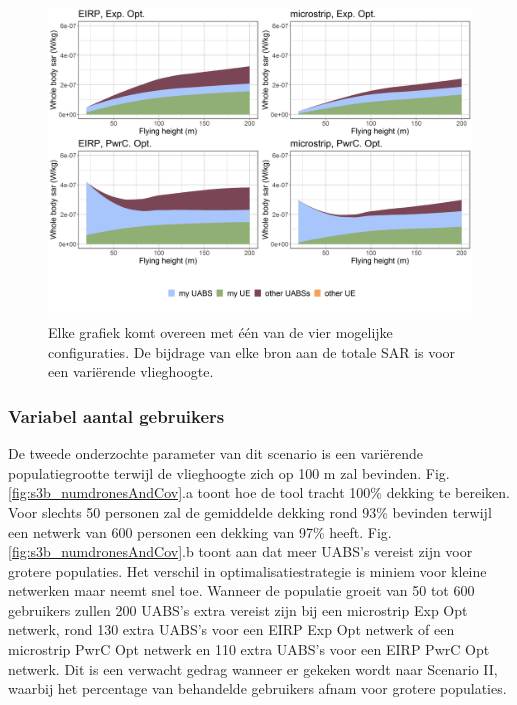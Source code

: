 \documentclass[twocolumn]{phdsymp_dutch}
\begin{document}
\begin{figure}[h!]
  \includegraphics[width=\linewidth]{../results/s3/fhFourSources.png}
  \caption{Elke grafiek komt overeen met \'e\'en van de vier mogelijke configuraties.
   De bijdrage van elke bron aan de totale \acs{SAR} is voor een variërende vlieghoogte.}
  \label{fig:s3a_fourSourcesMatrix}
\end{figure}

\subsubsection{Variabel aantal gebruikers}
De tweede onderzochte parameter van dit scenario is een vari\"erende populatiegrootte
terwijl de vlieghoogte zich op 100 m zal bevinden.
Fig.  \ref{fig:s3b_numdronesAndCov}.a toont hoe de tool tracht 100\% dekking te bereiken.
Voor slechts 50 personen zal de gemiddelde dekking
 rond 93\% bevinden terwijl een netwerk van 600 personen een dekking van 97\% heeft.
Fig. \ref{fig:s3b_numdronesAndCov}.b toont aan dat meer \gls{UABS}'s  vereist zijn voor grotere populaties.
Het verschil in optimalisatiestrategie is miniem voor kleine netwerken maar neemt snel toe. 
Wanneer de populatie groeit van 50 tot 600 gebruikers zullen 200 \gls{UABS}'s extra vereist zijn bij een
 microstrip \gls{Exp Opt} netwerk,
 rond 130 extra \gls{UABS}'s voor een \gls{EIRP} \gls{Exp Opt} netwerk of een microstrip \gls{PwrC Opt} netwerk
 en 110 extra \gls{UABS}'s voor een \gls{EIRP} \gls{PwrC Opt} netwerk.
Dit is een verwacht gedrag wanneer er gekeken wordt naar Scenario II,
waarbij het percentage van behandelde gebruikers afnam voor grotere populaties.
\end{document}
